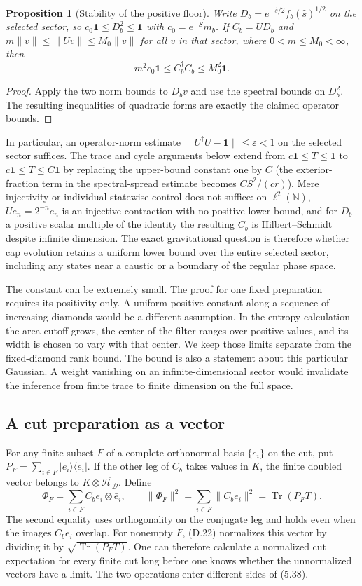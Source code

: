 \documentclass[11pt]{article}
\newcommand{\Tr}{\operatorname{Tr}}
\newcommand{\id}{\mathbf{1}}
\newcommand{\HH}{\mathcal H_{\mathcal D}}
\newcommand{\areaop}{\hat s}
\newtheorem{prop}{Proposition}
\begin{document}
\begin{prop}[Stability of the positive floor]\label{prop:coercive}
Write $D_b=e^{-\areaop/2}f_b(\areaop)^{1/2}$ on the selected sector, so $c_0\id\le D_b^2\le\id$ with $c_0=e^{-S}m_b$. If $C_b=UD_b$ and $m\|v\|\le\|Uv\|\le M_0\|v\|$ for all $v$ in that sector, where $0<m\le M_0<\infty$, then
\[
 m^2c_0\id\le C_b^\dagger C_b\le M_0^2\id.
\]
\end{prop}
\begin{proof}
Apply the two norm bounds to $D_bv$ and use the spectral bounds on $D_b^2$. The resulting inequalities of quadratic forms are exactly the claimed operator bounds.
\end{proof}
In particular, an operator-norm estimate $\|U^\dagger U-\id\|\le\varepsilon<1$ on the selected sector suffices. The trace and cycle arguments below extend from $c\id\le T\le\id$ to $c\id\le T\le C\id$ by replacing the upper-bound constant one by $C$ (the exterior-fraction term in the spectral-spread estimate becomes $CS^2/(cr)$). Mere injectivity or individual statewise control does not suffice: on $\ell^2(\mathbb N)$, $Ue_n=2^{-n}e_n$ is an injective contraction with no positive lower bound, and for $D_b$ a positive scalar multiple of the identity the resulting $C_b$ is Hilbert--Schmidt despite infinite dimension. The exact gravitational question is therefore whether cap evolution retains a uniform lower bound over the entire selected sector, including any states near a caustic or a boundary of the regular phase space.

The constant can be extremely small. The proof for one fixed preparation requires its positivity only. A uniform positive constant along a sequence of increasing diamonds would be a different assumption. In the entropy calculation the area cutoff grows, the center of the filter ranges over positive values, and its width is chosen to vary with that center. We keep those limits separate from the fixed-diamond rank bound. The bound is also a statement about this particular Gaussian. A weight vanishing on an infinite-dimensional sector would invalidate the inference from finite trace to finite dimension on the full space.

\subsection{A cut preparation as a vector}
For any finite subset $F$ of a complete orthonormal basis $\{e_i\}$ on the cut, put $P_F=\sum_{i\in F}|e_i\rangle\langle e_i|$. If the other leg of $C_b$ takes values in $K$, the finite doubled vector belongs to $K\otimes\overline{\HH}$. Define
\begin{equation}\label{eq:norm}
\Phi_F=\sum_{i\in F} C_be_i\otimes\bar e_i,\qquad
\|\Phi_F\|^2=\sum_{i\in F}\|C_be_i\|^2=\Tr(P_FT).
\end{equation}
The second equality uses orthogonality on the conjugate leg and holds even when the images $C_be_i$ overlap. For nonempty $F$, (D.22) normalizes this vector by dividing it by $\sqrt{\Tr(P_FT)}$. One can therefore calculate a normalized cut expectation for every finite cut long before one knows whether the unnormalized vectors have a limit. The two operations enter different sides of (5.38).
\end{document}
